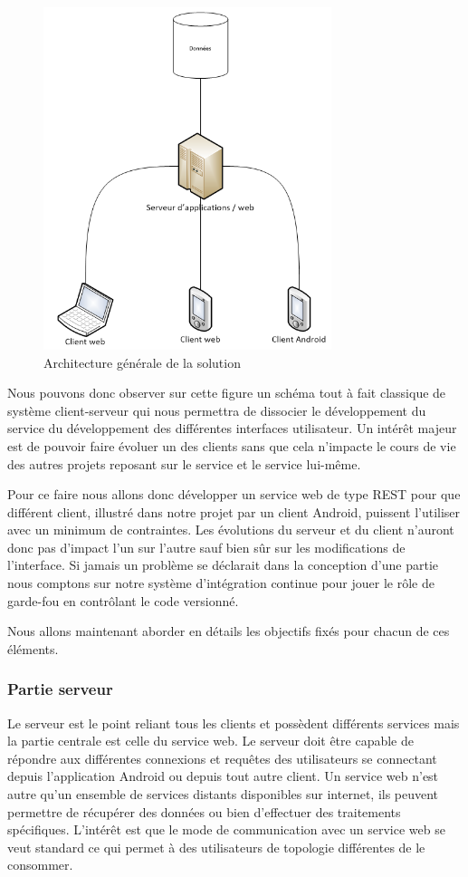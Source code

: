 \begin{figure}[H]
    \centering
    \includegraphics[height=10cm]{../infrastructure.png}
    \caption{Architecture générale de la solution}
    \label{architecture}
\end{figure}

Nous pouvons donc observer sur cette figure un schéma tout à fait classique de système client-serveur qui nous permettra de dissocier le développement du service du développement des différentes interfaces utilisateur. Un intérêt majeur est de pouvoir faire évoluer un des clients sans que cela n’impacte le cours de vie des autres projets reposant sur le service et le service lui-même.

Pour ce faire nous allons donc développer un service web de type REST pour que différent client, illustré dans notre projet par un client Android, puissent l’utiliser avec un minimum de contraintes. Les évolutions du serveur et du client n’auront donc pas d’impact l’un sur l’autre sauf bien sûr sur les modifications de l’interface. Si jamais un problème se déclarait dans la conception d’une partie nous comptons sur notre système d’intégration continue pour jouer le rôle de garde-fou en contrôlant le code versionné.

Nous allons maintenant aborder en détails les objectifs fixés pour chacun de ces éléments.

\subsubsection{Partie serveur}

Le serveur est le point reliant tous les clients et possèdent différents services mais la partie centrale est celle du service web. Le serveur doit être capable de répondre aux différentes connexions et requêtes des utilisateurs se connectant depuis l'application Android ou depuis tout autre client. Un service web n’est autre qu’un ensemble de services distants disponibles sur internet, ils peuvent permettre de récupérer des données ou bien d’effectuer des traitements spécifiques. L’intérêt est que le mode de communication avec un service web se veut standard ce qui permet à des utilisateurs de topologie différentes de le consommer.

